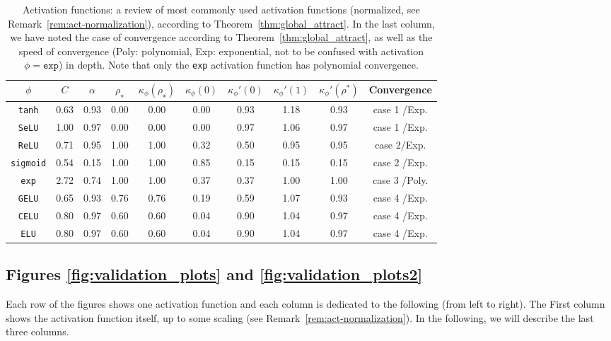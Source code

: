 \documentclass[twoside]{article}
\newcommand{\km}{\kappa_\phi}
\theoremstyle{definition}
\begin{document}
\begin{table}[ht]
\centering
\renewcommand{\arraystretch}{1.3}
\begin{tabular}{|c|c|c|c|c|c|c|c|c|c| }
\toprule
$\phi$ & $C$ & $\alpha$ & $\rho_\star$ & $\km(\rho_\star)$ & $\km(0)$ & $\km'(0)$ & $\km'(1)$ & $\km'(\rho^*)$ & Convergence \\ \midrule 
\texttt{tanh} &0.63 &0.93 &0.00 &0.00 &0.00 &0.93 &1.18 &0.93 &case 1 /Exp.\\ 
\texttt{SeLU} &1.00 &0.97 &0.00 &0.00 &0.00 &0.97 &1.06 &0.97 &case 1 /Exp.\\ 
\texttt{ReLU} &0.71 &0.95 &1.00 &1.00 &0.32 &0.50 &0.95 &0.95 &case 2/Exp.\\ 
\texttt{sigmoid} &0.54 &0.15 &1.00 &1.00 &0.85 &0.15 &0.15 &0.15 &case 2 /Exp. \\ 
\texttt{exp} &2.72 &0.74 &1.00 &1.00 &0.37 &0.37 &1.00 &1.00 &case 3 /Poly.\\ 
\texttt{GELU} &0.65 &0.93 &0.76 &0.76 &0.19 &0.59 &1.07 &0.93 &case 4 /Exp. \\ 
\texttt{CELU} &0.80 &0.97 &0.60 &0.60 &0.04 &0.90 &1.04 &0.97 &case 4 /Exp.\\ 
\texttt{ELU} &0.80 &0.97 &0.60 &0.60 &0.04 &0.90 &1.04 &0.97 &case 4 /Exp.\\ 
\bottomrule
\end{tabular}
\caption{Activation functions: a review of most commonly used activation functions (normalized, see Remark~\ref{rem:act-normalization}), according to Theorem~\ref{thm:global_attract}. In the last column, we have noted the case of convergence according to Theorem~\ref{thm:global_attract}, as well as the speed of convergence (Poly: polynomial, Exp: exponential, not to be confused with  activation $\phi=\texttt{exp}$) in depth. Note that only the \texttt{exp} activation function has polynomial convergence.}
\label{tab:activation_stats}
\end{table}

\subsection{Figures \ref{fig:validation_plots} and \ref{fig:validation_plots2}}
Each row of the figures shows one activation function and each column is dedicated to the following (from left to right). The First column shows the activation function itself, up to some scaling (see Remark~\ref{rem:act-normalization}). In the following, we will describe the last three columns. 
\end{document}
